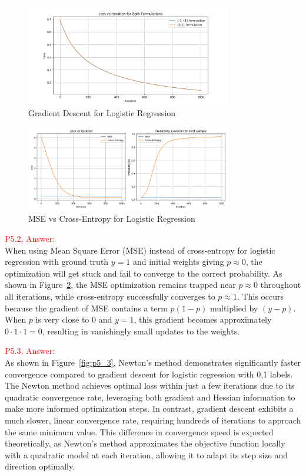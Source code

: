 \documentclass[11pt]{article}
\begin{document}
\begin{figure}[h]
	\centering
	\includegraphics[width=0.8\textwidth]{p5_1.png}
	\caption{Gradient Descent for Logistic Regression}
	\label{fig:p5_1}
	\end{figure}

\begin{figure}[h]
	\centering
	\includegraphics[width=0.8\textwidth]{p5_2.png}
	\caption{MSE vs Cross-Entropy for Logistic Regression}
	\label{fig:p5_2}
	\end{figure}

\textcolor{red}{P5.2, Answer:}\\

When using Mean Square Error (MSE) instead of cross-entropy for logistic regression with ground truth $y=1$ and initial weights giving $p\approx0$, the optimization 
will get stuck and fail to converge to the correct probability. As shown in Figure~\ref{fig:p5_2}, the MSE optimization remains trapped near $p \approx 0$ throughout 
all iterations, while cross-entropy successfully converges to $p \approx 1$. This occurs because the gradient of MSE contains a term $p(1-p)$ multiplied by $(y-p)$. 
When $p$ is very close to 0 and $y=1$, this gradient becomes approximately $0 \cdot 1 \cdot 1 = 0$, resulting in vanishingly small updates to the weights.

\newpage
\textcolor{red}{P5.3, Answer:}\\

As shown in Figure~\ref{fig:p5_3}, Newton's method demonstrates significantly faster convergence compared to gradient descent for logistic regression with {0,1} labels. 
The Newton method achieves optimal loss within just a few iterations due to its quadratic convergence rate, leveraging both gradient and Hessian 
information to make more informed optimization steps. In contrast, gradient descent exhibits a much slower, linear convergence rate, requiring 
hundreds of iterations to approach the same minimum value. This difference in convergence speed is expected theoretically, as Newton's method approximates 
the objective function locally with a quadratic model at each iteration, allowing it to adapt its step size and direction optimally.
\end{document}
